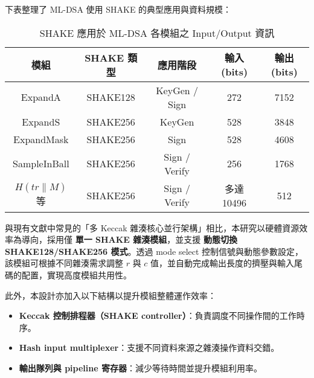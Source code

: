 \documentclass[12pt, a4paper, fleqn]{./styles/ntust_report}
\begin{document}
下表整理了 ML-DSA 使用 SHAKE 的典型應用與資料規模：

\begin{table}[H]
\centering
\caption{SHAKE 應用於 ML-DSA 各模組之 Input/Output 資訊}
\begin{tabular}{|c|c|c|c|c|}
\hline
\textbf{模組} & \textbf{SHAKE 類型} & \textbf{應用階段} & \textbf{輸入(bits)} & \textbf{輸出(bits)} \\
\hline
ExpandA & SHAKE128 & KeyGen / Sign & 272 & 7152 \\
ExpandS & SHAKE256 & KeyGen & 528 & 3848 \\
ExpandMask & SHAKE256 & Sign & 528 & 4608 \\
SampleInBall & SHAKE256 & Sign / Verify & 256 & 1768 \\
$H(tr\|M)$ 等 & SHAKE256 & Sign / Verify & 多達 10496 & 512 \\
\hline
\end{tabular}
\end{table}

與現有文獻中常見的「多 Keccak 雜湊核心並行架構」相比，本研究以硬體資源效率為導向，採用僅 \textbf{單一 SHAKE 雜湊模組}，並支援 \textbf{動態切換 SHAKE128/SHAKE256 模式}。透過 mode select 控制信號與動態參數設定，該模組可根據不同雜湊需求調整 $r$ 與 $c$ 值，並自動完成輸出長度的擠壓與輸入尾碼的配置，實現高度模組共用性。

此外，本設計亦加入以下結構以提升模組整體運作效率：
\begin{itemize}
    \item \textbf{Keccak 控制排程器（SHAKE controller）}：負責調度不同操作間的工作時序。
    \item \textbf{Hash input multiplexer}：支援不同資料來源之雜湊操作資料交錯。
    \item \textbf{輸出隊列與 pipeline 寄存器}：減少等待時間並提升模組利用率。
\end{itemize}










\ifdefined\integrated\else

\end{document}
